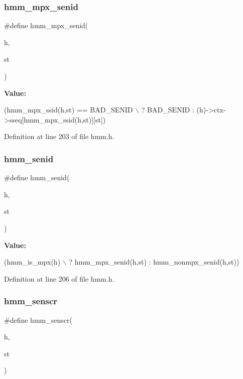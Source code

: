 \subsubsection{hmm\+\_\+mpx\+\_\+senid}
{\footnotesize\ttfamily \#define hmm\+\_\+mpx\+\_\+senid(\begin{DoxyParamCaption}\item[{}]{h,  }\item[{}]{st }\end{DoxyParamCaption})}

{\bfseries Value\+:}
\begin{DoxyCode}
(hmm\_mpx\_ssid(h,st) == BAD_SENID \(\backslash\)
                             ? BAD_SENID : (h)->ctx->sseq[hmm\_mpx\_ssid(h,st)][st])
\end{DoxyCode}


Definition at line 203 of file hmm.\+h.

\mbox{\label{hmm_8h_ae3f2856c4774fe4ba0217bdf97410264}} 
\subsubsection{hmm\+\_\+senid}
{\footnotesize\ttfamily \#define hmm\+\_\+senid(\begin{DoxyParamCaption}\item[{}]{h,  }\item[{}]{st }\end{DoxyParamCaption})}

{\bfseries Value\+:}
\begin{DoxyCode}
(hmm\_is\_mpx(h)                                  \(\backslash\)
                         ? hmm\_mpx\_senid(h,st) : hmm\_nonmpx\_senid(h,st))
\end{DoxyCode}


Definition at line 206 of file hmm.\+h.

\mbox{\label{hmm_8h_a0c8de8756d4263b2a36957cb42075740}} 
\subsubsection{hmm\+\_\+senscr}
{\footnotesize\ttfamily \#define hmm\+\_\+senscr(\begin{DoxyParamCaption}\item[{}]{h,  }\item[{}]{st }\end{DoxyParamCaption})}

